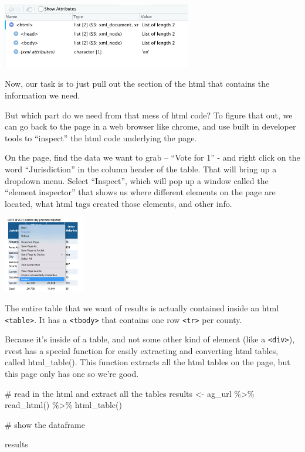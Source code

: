 \documentclass[
  letterpaper,
  DIV=11,
  numbers=noendperiod]{scrreprt}
\newenvironment{Shaded}{\begin{snugshade}}{\end{snugshade}}
\newcommand{\CommentTok}[1]{\textcolor[rgb]{0.37,0.37,0.37}{#1}}
\newcommand{\FunctionTok}[1]{\textcolor[rgb]{0.28,0.35,0.67}{#1}}
\newcommand{\NormalTok}[1]{\textcolor[rgb]{0.00,0.23,0.31}{#1}}
\newcommand{\OtherTok}[1]{\textcolor[rgb]{0.00,0.23,0.31}{#1}}
\newcommand{\SpecialCharTok}[1]{\textcolor[rgb]{0.37,0.37,0.37}{#1}}
\begin{document}
\includegraphics[width=3.25in,height=\textheight]{./images/rvest3.png}

Now, our task is to just pull out the section of the html that contains
the information we need.

But which part do we need from that mess of html code? To figure that
out, we can go back to the page in a web browser like chrome, and use
built in developer tools to ``inspect'' the html code underlying the
page.

On the page, find the data we want to grab -- ``Vote for 1'' - and right
click on the word ``Jurisdiction'' in the column header of the table.
That will bring up a dropdown menu. Select ``Inspect'', which will pop
up a window called the ``element inspector'' that shows us where
different elements on the page are located, what html tags created those
elements, and other info.

\includegraphics[width=1.41in,height=\textheight]{./images/rvest4.png}

The entire table that we want of results is actually contained inside an
html \texttt{\textless{}table\textgreater{}}. It has a
\texttt{\textless{}tbody\textgreater{}} that contains one row
\texttt{\textless{}tr\textgreater{}} per county.

Because it's inside of a table, and not some other kind of element (like
a \texttt{\textless{}div\textgreater{}}), rvest has a special function
for easily extracting and converting html tables, called html\_table().
This function extracts all the html tables on the page, but this page
only has one so we're good.

\begin{Shaded}
\begin{Highlighting}[]
\CommentTok{\# read in the html and extract all the tables}
\NormalTok{results }\OtherTok{\textless{}{-}}\NormalTok{ ag\_url }\SpecialCharTok{\%\textgreater{}\%}
  \FunctionTok{read\_html}\NormalTok{() }\SpecialCharTok{\%\textgreater{}\%}
  \FunctionTok{html\_table}\NormalTok{()}

\CommentTok{\# show the dataframe}

\NormalTok{results}
\end{Highlighting}
\end{Shaded}
\end{document}
